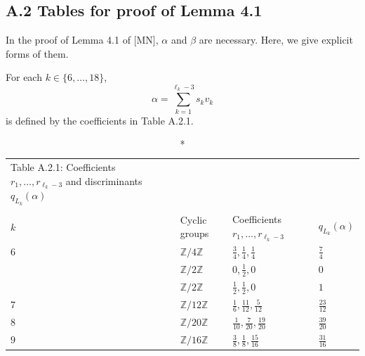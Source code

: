\documentclass[10pt]{article}
\begin{document}
 
 
 
 \subsection*{A.2 Tables  for  proof of Lemma 4.1}

In the proof of Lemma 4.1 of [MN],
 $\alpha$ and $\beta$ are necessary.
 Here, we give explicit forms of them.


For each $k\in \{6,\ldots,18\}$,
$$\alpha = \sum_{k=1}^{\ell_k-3} s_k v_k $$
is defined by the coefficients in Table A.2.1.

\begin{longtable}{llll}
\caption*{Table A.2.1: Coefficients  $r_1,\ldots,r_{\ell_k-3}$ and discriminants  $q_{L_k}(\alpha) $}
\vspace{-5.5mm}\\
\\
\hline
  $k$ & Cyclic groups &  Coefficients  $r_1,\ldots, r_{\ell_k-3}$  & $q_{L_k} (\alpha)$  \vspace{1mm}
    \\
  \hline   %
  \endhead
\vspace{1mm}$6$ &$ \mathbb{Z}/4\mathbb{Z}$ & $\frac{3}{4},\frac{1}{4},\frac{1}{4}$   & $\frac{7}{4}$ \vspace{1mm}\\
\vspace{1mm} &$\mathbb{Z}/2\mathbb{Z}$ &  $0, \frac{1}{2}, 0$   & $0$ \vspace{1mm}\\
\vspace{1mm} &$\mathbb{Z}/2\mathbb{Z}$ &  $\frac{1}{2}, \frac{1}{2}, 0 $   & $1$ \vspace{1mm}\\
\vspace{1mm}$7$ &$ \mathbb{Z}/12\mathbb{Z}$ & $\frac{1}{6}, \frac{11}{12}, \frac{5}{12}$  & $\frac{23}{12}$ \vspace{1mm}\\
\vspace{1mm}$8$ &  $ \mathbb{Z}/20\mathbb{Z}$ & $\frac{1}{10},\frac{7}{20},\frac{19}{20}$  & $\frac{39}{20}$ \vspace{1mm}\\
\vspace{1mm}$9$ & $ \mathbb{Z}/16\mathbb{Z}$ & $\frac{3}{8},\frac{1}{8},\frac{15}{16}$ &  $\frac{31}{16}$ \vspace{1mm}\\

\end{longtable}
\end{document}

